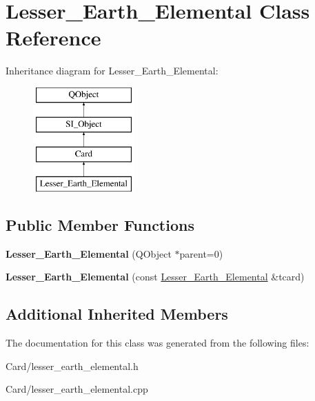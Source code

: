 \hypertarget{class_lesser___earth___elemental}{}\section{Lesser\+\_\+\+Earth\+\_\+\+Elemental Class Reference}
\label{class_lesser___earth___elemental}
Inheritance diagram for Lesser\+\_\+\+Earth\+\_\+\+Elemental\+:\begin{figure}[H]
\begin{center}
\leavevmode
\includegraphics[height=4.000000cm]{class_lesser___earth___elemental}
\end{center}
\end{figure}
\subsection*{Public Member Functions}
\begin{DoxyCompactItemize}
\item 
\mbox{\label{class_lesser___earth___elemental_a05af235942b13284bbaadf77d6bc4436}} 
{\bfseries Lesser\+\_\+\+Earth\+\_\+\+Elemental} (Q\+Object $\ast$parent=0)
\item 
\mbox{\label{class_lesser___earth___elemental_a437be926bc77c2b4e6428811d4e93e51}} 
{\bfseries Lesser\+\_\+\+Earth\+\_\+\+Elemental} (const \hyperlink{class_lesser___earth___elemental}{Lesser\+\_\+\+Earth\+\_\+\+Elemental} \&tcard)
\end{DoxyCompactItemize}
\subsection*{Additional Inherited Members}


The documentation for this class was generated from the following files\+:\begin{DoxyCompactItemize}
\item 
Card/lesser\+\_\+earth\+\_\+elemental.\+h\item 
Card/lesser\+\_\+earth\+\_\+elemental.\+cpp\end{DoxyCompactItemize}

